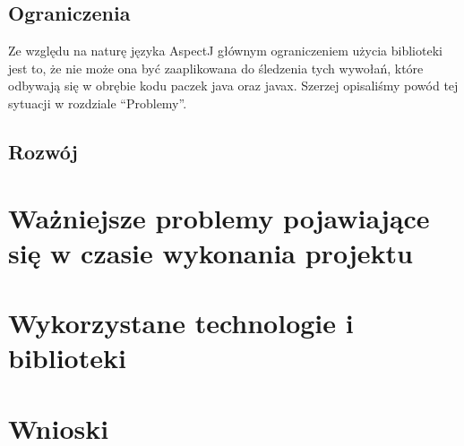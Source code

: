 \documentclass[12pt,a4paper,titlepage]{article}
\begin{document}
  \subsection{Ograniczenia}
   Ze względu na naturę języka AspectJ głównym ograniczeniem użycia biblioteki jest to, że nie może ona być zaaplikowana do śledzenia tych wywołań, które odbywają się w obrębie kodu paczek java oraz javax. Szerzej opisaliśmy powód tej sytuacji w rozdziale ``Problemy''.
  \subsection{Rozwój}
\section[Problemy]{Ważniejsze problemy pojawiające się w czasie wykonania projektu}
\section{Wykorzystane technologie i biblioteki}
\section{Wnioski}
\end{document}
